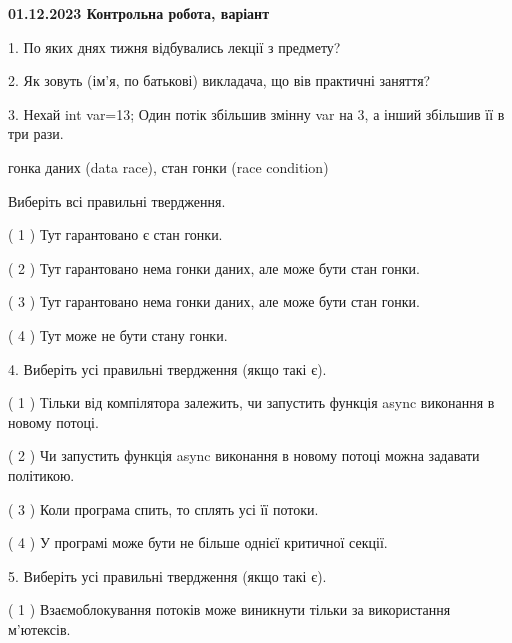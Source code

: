 \documentclass[12pt, ukrainian]{article}
\begin{document}
\vspace{4mm}
\newpage
\begin {large}

\textbf{01.12.2023 Контрольна робота, варіант  }\par


{
1. По яких днях тижня відбувались лекції з предмету?



\vspace{5mm}
2. Як зовуть (ім'я, по батькові) викладача, що вів практичні заняття?



\vspace{5mm}
3. Нехай int var=13; Один потік збільшив змінну var на 3, а інший збільшив її в три рази.

гонка даних (data race), стан гонки (race condition)

Виберіть всі правильні твердження.\par
\vspace{2mm}
( 1 ) Тут гарантовано є стан гонки.%

( 2 ) Тут гарантовано нема гонки даних, але може бути стан гонки.%

( 3 ) Тут гарантовано нема гонки даних, але може бути стан гонки.%

( 4 ) Тут може не бути стану гонки.%


\vspace{5mm}
4. Виберіть усі правильні твердження (якщо такі є).\par
\vspace{2mm}

( 1 ) Тільки від компілятора залежить, чи запустить функція async виконання в новому потоці.%

( 2 ) Чи запустить функція  async виконання в новому потоці можна задавати політикою.%

( 3 ) Коли програма спить, то сплять усі її потоки.%

( 4 ) У програмі може бути не більше однієї критичної секції.%


\vspace{5mm}
5. Виберіть усі правильні твердження (якщо такі є).\par
\vspace{2mm}

( 1 ) Взаємоблокування потоків може виникнути тільки за використання м’ютексів.%

}
\end{large}
\end{document}
